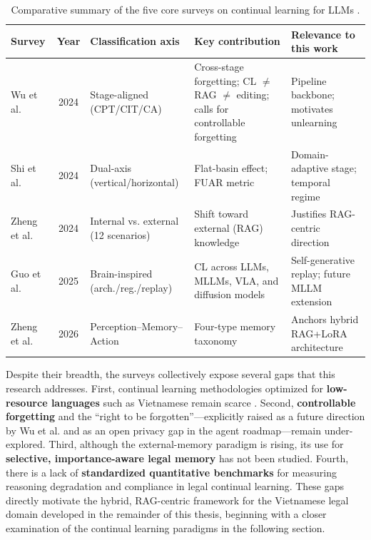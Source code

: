 \begin{table}[H]
\centering
\footnotesize
\caption{Comparative summary of the five core surveys on continual learning for LLMs \parencite{wu2024continuallearninglargelanguage, shi2024continuallearninglargelanguage, zheng2024lifelonglearninglargelanguage, guo2025continuallearninggenerativeai, 11328884}.}
\label{tab:survey_comparison}
\begin{tabularx}{\textwidth}{l c >{\raggedright\arraybackslash}p{2.7cm} X X}
\hline
\textbf{Survey} & \textbf{Year} & \textbf{Classification axis} & \textbf{Key contribution} & \textbf{Relevance to this work} \\
\hline
Wu et al.   & 2024 & Stage-aligned (CPT/CIT/CA) & Cross-stage forgetting; CL $\neq$ RAG $\neq$ editing; calls for controllable forgetting & Pipeline backbone; motivates unlearning \\
Shi et al.  & 2024 & Dual-axis (vertical/horizontal) & Flat-basin effect; FUAR metric & Domain-adaptive stage; temporal regime \\
Zheng et al.& 2024 & Internal vs. external (12 scenarios) & Shift toward external (RAG) knowledge & Justifies RAG-centric direction \\
Guo et al.  & 2025 & Brain-inspired (arch./\allowbreak reg./\allowbreak replay) & CL across LLMs, MLLMs, VLA, and diffusion models & Self-generative replay; future MLLM extension \\
Zheng et al.& 2026 & Perception--Memory--Action & Four-type memory taxonomy & Anchors hybrid RAG+LoRA architecture \\
\hline
\end{tabularx}
\end{table}

Despite their breadth, the surveys collectively expose several gaps that this research addresses. First, continual learning methodologies optimized for \textbf{low-resource languages} such as Vietnamese remain scarce \parencite{wu2024continuallearninglargelanguage, zheng2024lifelonglearninglargelanguage, 11328884}. Second, \textbf{controllable forgetting} and the ``right to be forgotten''---explicitly raised as a future direction by Wu et al. and as an open privacy gap in the agent roadmap---remain under-explored. Third, although the external-memory paradigm is rising, its use for \textbf{selective, importance-aware legal memory} has not been studied. Fourth, there is a lack of \textbf{standardized quantitative benchmarks} for measuring reasoning degradation and compliance in legal continual learning. These gaps directly motivate the hybrid, RAG-centric framework for the Vietnamese legal domain developed in the remainder of this thesis, beginning with a closer examination of the continual learning paradigms in the following section.
